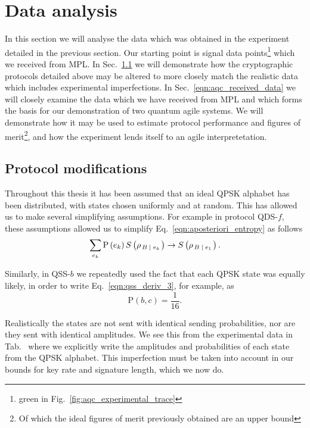 \clearpage
\section{Data analysis}
In this section we will analyse the data which was obtained in the experiment detailed in the previous section. Our starting point is signal data points\footnote{green in Fig.~\ref{fig:aqc_experimental_trace}} which we received from MPL. In Sec.~\ref{sec:aqc_protocol_modifications} we will demonstrate how the cryptographic protocols detailed above may be altered to more closely match the realistic data which includes experimental imperfections. %
In Sec.~\ref{eqn:aqc_received_data} we will closely examine the data which we have received from MPL and which forms the basis for our demonstration of two quantum agile systems. We will demonstrate how it may be used to estimate protocol performance and figures of merit\footnote{Of which the ideal figures of merit previously obtained are an upper bound}, and how the experiment lends itself to an agile interpretetation.


\subsection{Protocol modifications}\label{sec:aqc_protocol_modifications}
Throughout this thesis it has been assumed that an ideal QPSK alphabet has been distributed, with states chosen uniformly and at random. This has allowed us to make several simplifying assumptions. For example in protocol QDS-$f$, these assumptions allowed us to simplify Eq.~\ref{eqn:aposteriori_entropy} as follows
\begin{equation}
\sum_{e_k} \text{P}\left(e_k\right) S\left(\rho_{\left. B \; \middle| \; e_k\right.}\right) \rightarrow S\left(\rho_{\left. B \; \middle| \; e_1\right.}\right).
\end{equation}

\noindent Similarly, in QSS-$b$ we repeatedly used the fact that each QPSK state was equally likely, in order to write Eq.~\ref{eqn:qss_deriv_3}, for example, as
\begin{equation}
\text{P}\left(b, c\right) = \frac{1}{16}.
\end{equation}

\noindent Realistically the states are not sent with identical sending probabilities, nor are they sent with identical amplitudes. We see this from the experimental data in Tab.~ where we explicitly write the amplitudes and probabilities of each state from the QPSK alphabet. This imperfection must be taken into account in our bounds for key rate and signature length, which we now do.

